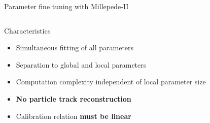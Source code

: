 \documentclass{ikpKoeln}
\begin{document}
\begin{frame}[t]{Parameter fine tuning with Millepede-II}
	\vspace{-2em}
	\begin{columns}[t]
		\begin{column}{0.45 \textwidth}
			\begin{exampleblock} {Characteristics}
				\begin{itemize}
					\item Simultaneous fitting of all parameters
					\item Separation to global and local parameters
					\item Computation complexity independent of local parameter size
					\item \alert{\textbf{No particle track reconstruction}}
					\item Calibration relation \textbf{must be linear}
				\end{itemize}
			\end{exampleblock}


\end{column}
\end{columns}
\end{frame}
\end{document}
